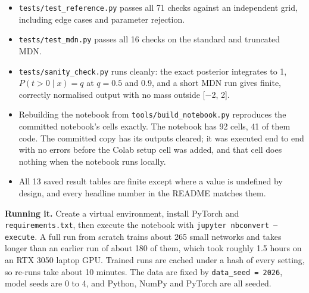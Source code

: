 \documentclass[11pt,a4paper]{article}
\begin{document}
\begin{itemize}
\item \texttt{tests/\allowbreak{}test\_\allowbreak{}reference.py} passes all 71 checks against an independent grid, including edge cases and parameter rejection.
\item \texttt{tests/\allowbreak{}test\_\allowbreak{}mdn.py} passes all 16 checks on the standard and truncated MDN.
\item \texttt{tests/\allowbreak{}sanity\_\allowbreak{}check.py} runs cleanly: the exact posterior integrates to 1, $P(t > 0 \mid  x) = q$ at $q = 0.5$ and 0.9, and a short MDN run gives finite, correctly normalised output with no mass outside [$-$2, 2].
\item Rebuilding the notebook from \texttt{tools/\allowbreak{}build\_\allowbreak{}notebook.py} reproduces the committed notebook's cells exactly. The notebook has 92 cells, 41 of them code. The committed copy has its outputs cleared; it was executed end to end with no errors before the Colab setup cell was added, and that cell does nothing when the notebook runs locally.
\item All 13 saved result tables are finite except where a value is undefined by design, and every headline number in the README matches them.
\end{itemize}

\textbf{Running it.} Create a virtual environment, install PyTorch and \texttt{requirements.txt}, then execute the notebook with \texttt{jupyter nbconvert --execute}. A full run from scratch trains about 265 small networks and takes longer than an earlier run of about 180 of them, which took roughly 1.5 hours on an RTX 3050 laptop GPU. Trained runs are cached under a hash of every setting, so re-runs take about 10 minutes. The data are fixed by \texttt{data\_\allowbreak{}seed = 2026}, model seeds are 0 to 4, and Python, NumPy and PyTorch are all seeded.
\end{document}
